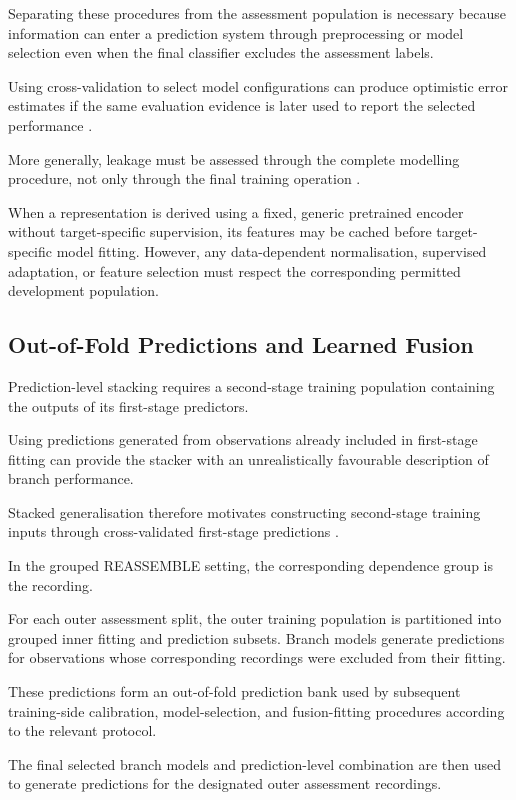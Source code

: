 Separating these procedures from the assessment population is necessary because information can enter a prediction system through preprocessing or model selection even when the final classifier excludes the assessment labels.

Using cross-validation to select model configurations can produce optimistic error estimates if the same evaluation evidence is later used to report the selected performance \parencite{P004}.

More generally, leakage must be assessed through the complete modelling procedure, not only through the final training operation \parencite{P017}.

When a representation is derived using a fixed, generic pretrained encoder without target-specific supervision, its features may be cached before target-specific model fitting. However, any data-dependent normalisation, supervised adaptation, or feature selection must respect the corresponding permitted development population.

\subsection{Out-of-Fold Predictions and Learned Fusion}

Prediction-level stacking requires a second-stage training population containing the outputs of its first-stage predictors.

Using predictions generated from observations already included in first-stage fitting can provide the stacker with an unrealistically favourable description of branch performance.

Stacked generalisation therefore motivates constructing second-stage training inputs through cross-validated first-stage predictions \parencite{Ting1999StackedGeneralization}.

In the grouped REASSEMBLE setting, the corresponding dependence group is the recording.

For each outer assessment split, the outer training population is partitioned into grouped inner fitting and prediction subsets. Branch models generate predictions for observations whose corresponding recordings were excluded from their fitting.

These predictions form an out-of-fold prediction bank used by subsequent training-side calibration, model-selection, and fusion-fitting procedures according to the relevant protocol.

The final selected branch models and prediction-level combination are then used to generate predictions for the designated outer assessment recordings.

